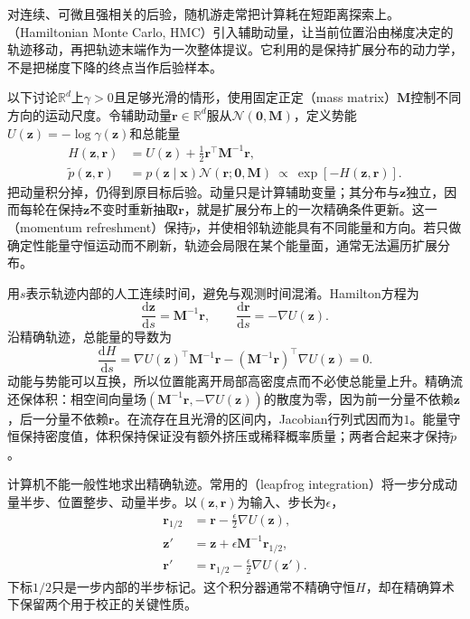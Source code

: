 对连续、可微且强相关的后验，随机游走常把计算耗在短距离探索上。（Hamiltonian Monte Carlo, HMC）引入辅助动量，让当前位置沿由梯度决定的轨迹移动，再把轨迹末端作为一次整体提议。它利用的是保持扩展分布的动力学，不是把梯度下降的终点当作后验样本。

以下讨论$\mathbb{R}^{d}$上$\gamma>0$且足够光滑的情形，使用固定正定（mass matrix）$\bm{M}$控制不同方向的运动尺度。令辅助动量$\bm{r}\in\mathbb{R}^{d}$服从$\mathcal{N}(\bm{0},\bm{M})$，定义势能$U(\bm{z})=-\log\gamma(\bm{z})$和总能量
\begin{equation}
  \begin{aligned}
    H(\bm{z},\bm{r})&=U(\bm{z})+\frac12\bm{r}^{\top}\bm{M}^{-1}\bm{r},\\
    \widetilde p(\bm{z},\bm{r})
      &=p(\bm{z}\mid\bm{x})\mathcal{N}(\bm{r};\bm{0},\bm{M})
        \ \propto\ \exp[-H(\bm{z},\bm{r})].
  \end{aligned}
  \label{eq:pgm-sampling-hamiltonian}
\end{equation}
把动量积分掉，仍得到原目标后验。动量只是计算辅助变量；其分布与$\bm{z}$独立，因而每轮在保持$\bm{z}$不变时重新抽取$\bm{r}$，就是扩展分布上的一次精确条件更新。这一（momentum refreshment）保持$\widetilde p$，并使相邻轨迹能具有不同能量和方向。若只做确定性能量守恒运动而不刷新，轨迹会局限在某个能量面，通常无法遍历扩展分布。

用$s$表示轨迹内部的人工连续时间，避免与观测时间混淆。Hamilton方程为
\begin{equation}
  \frac{\mathrm{d}\bm{z}}{\mathrm{d}s}=\bm{M}^{-1}\bm{r},
  \qquad
  \frac{\mathrm{d}\bm{r}}{\mathrm{d}s}=-\nabla U(\bm{z}).
  \label{eq:pgm-sampling-hamilton-equations}
\end{equation}
沿精确轨迹，总能量的导数为
\[
  \frac{\mathrm{d}H}{\mathrm{d}s}
    =\nabla U(\bm{z})^{\top}\bm{M}^{-1}\bm{r}
       -(\bm{M}^{-1}\bm{r})^{\top}\nabla U(\bm{z})=0.
\]
动能与势能可以互换，所以位置能离开局部高密度点而不必使总能量上升。精确流还保体积：相空间向量场$(\bm{M}^{-1}\bm{r},-\nabla U(\bm{z}))$的散度为零，因为前一分量不依赖$\bm{z}$，后一分量不依赖$\bm{r}$。在流存在且光滑的区间内，Jacobian行列式因而为$1$。能量守恒保持密度值，体积保持保证没有额外挤压或稀释概率质量；两者合起来才保持$\widetilde p$。

计算机不能一般性地求出精确轨迹。常用的（leapfrog integration）将一步分成动量半步、位置整步、动量半步。以$(\bm{z},\bm{r})$为输入、步长为$\epsilon$，
\begin{equation}
  \begin{aligned}
    \bm{r}_{1/2}&=\bm{r}-\frac{\epsilon}{2}\nabla U(\bm{z}),\\
    \bm{z}'&=\bm{z}+\epsilon\bm{M}^{-1}\bm{r}_{1/2},\\
    \bm{r}'&=\bm{r}_{1/2}-\frac{\epsilon}{2}\nabla U(\bm{z}').
  \end{aligned}
  \label{eq:pgm-sampling-leapfrog}
\end{equation}
下标$1/2$只是一步内部的半步标记。这个积分器通常不精确守恒$H$，却在精确算术下保留两个用于校正的关键性质。

